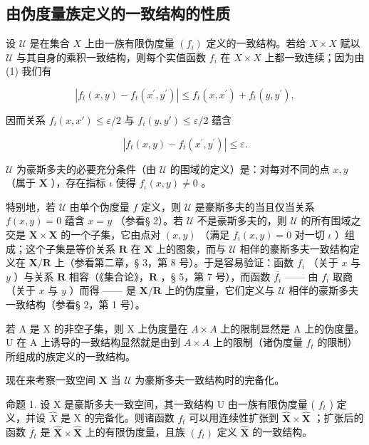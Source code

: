 \subsection{由伪度量族定义的一致结构的性质}

设 \(\mathcal{U}\) 是在集合 \(X\) 上由一族有限伪度量 \((f_{i})\) 定义的一致结构。若给 \(X \times X\) 赋以 \(\mathcal{U}\) 与其自身的乘积一致结构，则每个实值函数 \(f_{i}\) 在 \(X \times X\) 上都一致连续；因为由 (1) 我们有

\[
\left| f _ {t} (x, y) - f _ {t} \left(x ^ {\prime}, y ^ {\prime}\right) \right| \leqslant f _ {t} (x, x ^ {\prime}) + f _ {t} (y, y ^ {\prime}),
\]

因而关系 \(f_{i}(x, x') \leqslant \varepsilon / 2\) 与 \(f_{i}(y, y') \leqslant \varepsilon / 2\) 蕴含

\[
\left| f _ {t} (x, y) - f _ {t} \left(x ^ {\prime}, y ^ {\prime}\right) \right| \leqslant \varepsilon .
\]

\(\mathcal{U}\) 为豪斯多夫的必要充分条件（由 \(\mathcal{U}\) 的围域的定义）是：对每对不同的点 \(x, y\) （属于 \(\mathbf{X}\) ），存在指标 \(\iota\) 使得 \(f_{\iota}(x, y) \neq 0\) 。

特别地，若 \(\mathcal{U}\) 由单个伪度量 \(f\) 定义，则 \(\mathcal{U}\) 是豪斯多夫的当且仅当关系 \(f(x,y)=0\) 蕴含 \(x=y\) （参看§ 2）。若 \(\mathcal{U}\) 不是豪斯多夫的，则 \(\mathcal{U}\) 的所有围域之交是 \(\mathbf{X} \times \mathbf{X}\) 的一个子集，它由点对 \((x,y)\) （满足 \(f_{i}(x,y)=0\) 对一切 \(\iota\) ）组成；这个子集是等价关系 \(\mathbf{R}\) 在 \(\mathbf{X}\) 上的图象，而与 \(\mathcal{U}\) 相伴的豪斯多夫一致结构定义在 \(\mathbf{X}/\mathbf{R}\) 上（参看第二章，§ 3，第 8 号）。于是容易验证：函数 \(f_{i}\) （关于 \(x\) 与 \(y\) ）与关系 \(\mathbf{R}\) 相容（《集合论》，\(\mathbf{R}\) ，§ 5，第 7 号），而函数 \(\overline{f_{i}}\) —— 由 \(f_{i}\) 取商（关于 \(x\) 与 \(y\) ）而得 —— 是 \(\mathbf{X}/\mathbf{R}\) 上的伪度量，它们定义与 \(\mathcal{U}\) 相伴的豪斯多夫一致结构（参看§ 2，第 1 号）。

若 A 是 X 的非空子集，则 X 上伪度量在 \(A \times A\) 上的限制显然是 A 上的伪度量。U 在 A 上诱导的一致结构显然就是由到 \(A \times A\) 上的限制（诸伪度量 \(f_{t}\) 的限制）所组成的族定义的一致结构。

现在来考察一致空间 \(\mathbf{X}\) 当 \(\mathcal{U}\) 为豪斯多夫一致结构时的完备化。

命题 1. 设 X 是豪斯多夫一致空间，其一致结构 U 由一族有限伪度量 ( \(f_{t}\) ) 定义，并设 \(\hat{X}\) 是 X 的完备化。则诸函数 \(f_{t}\) 可以用连续性扩张到 \(\hat{\mathbf{X}} \times \hat{\mathbf{X}}\) ；扩张后的函数 \(\overline{f_t}\) 是 \(\hat{\mathbf{X}} \times \hat{\mathbf{X}}\) 上的有限伪度量，且族 \((f_{t})\) 定义 \(\hat{\mathbf{X}}\) 的一致结构。

